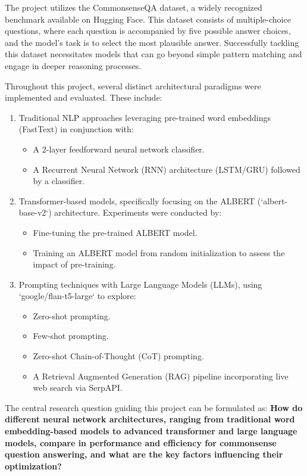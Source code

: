 \documentclass[10.5pt]{article}
\begin{document}
The project utilizes the CommonsenseQA dataset, a widely recognized benchmark available on Hugging Face. This dataset consists of multiple-choice questions, where each question is accompanied by five possible answer choices, and the model's task is to select the most plausible answer. Successfully tackling this dataset necessitates models that can go beyond simple pattern matching and engage in deeper reasoning processes.

Throughout this project, several distinct architectural paradigms were implemented and evaluated. These include:
\begin{enumerate}
    \item Traditional NLP approaches leveraging pre-trained word embeddings (FastText) in conjunction with:
        \begin{itemize}
            \item A 2-layer feedforward neural network classifier.
            \item A Recurrent Neural Network (RNN) architecture (LSTM/GRU) followed by a classifier.
        \end{itemize}
    \item Transformer-based models, specifically focusing on the ALBERT (`albert-base-v2`) architecture. Experiments were conducted by:
        \begin{itemize}
            \item Fine-tuning the pre-trained ALBERT model.
            \item Training an ALBERT model from random initialization to assess the impact of pre-training.
        \end{itemize}
    \item Prompting techniques with Large Language Models (LLMs), using `google/flan-t5-large` to explore:
        \begin{itemize}
            \item Zero-shot prompting.
            \item Few-shot prompting.
            \item Zero-shot Chain-of-Thought (CoT) prompting.
            \item A Retrieval Augmented Generation (RAG) pipeline incorporating live web search via SerpAPI.
        \end{itemize}
\end{enumerate}

The central research question guiding this project can be formulated as: \textbf{How do different neural network architectures, ranging from traditional word embedding-based models to advanced transformer and large language models, compare in performance and efficiency for commonsense question answering, and what are the key factors influencing their optimization?}
\end{document}
